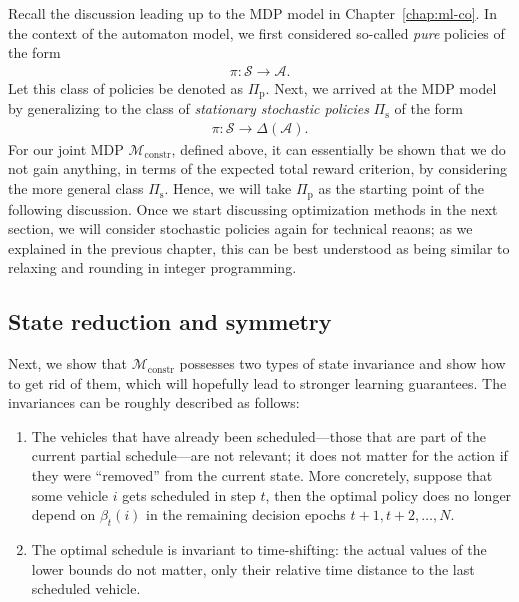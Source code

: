 \documentclass[a4paper]{report}
\theoremstyle{definition}
\theoremstyle{plain}
\begin{document}
Recall the discussion leading up to the MDP model in Chapter~\ref{chap:ml-co}.
%
In the context of the automaton model, we first considered so-called \emph{pure}
policies of the form
\begin{align}
  \label{eq:9}
  \pi : \mathcal{S} \rightarrow \mathcal{A} .
\end{align}
Let this class of policies be denoted as $\Pi_\mathrm{p}$. Next, we arrived
at the MDP model by generalizing to the class of \emph{stationary stochastic
  policies} $\Pi_\mathrm{s}$ of the form
\begin{align}
  \pi : \mathcal{S} \rightarrow \Delta(\mathcal{A}) .
\end{align}
%
For our joint MDP $\mathcal{M}_\mathrm{constr}$, defined above, it can essentially be shown that
we do not gain anything, in terms of the expected total reward criterion, by
considering the more general class $\Pi_\mathrm{s}$.
%
Hence, we will take $\Pi_\mathrm{p}$ as the starting point of the following
discussion.
%
Once we start discussing optimization methods in the next section, we will
consider stochastic policies again for technical reaons; as we explained in the
previous chapter, this can be best understood as being similar to relaxing and
rounding in integer programming.


\subsection{State reduction and symmetry}

Next, we show that $\mathcal{M}_\mathrm{constr}$ possesses two types of state
invariance and show how to get rid of them, which will hopefully lead to
stronger learning guarantees. The invariances can be roughly described as
follows:
\begin{enumerate}[label=(\roman*)\;\;,leftmargin=3.5em,midpenalty=5]
  \item The vehicles that have already been scheduled---those that are part of
        the current partial schedule---are not relevant; it does not matter for
        the action if they were ``removed'' from the current state.
        More concretely, suppose that some vehicle $i$ gets scheduled in step
        $t$, then the optimal policy does no longer depend on $\beta_t(i)$ in
        the remaining decision epochs $t+1, t+2, \dots, N$.

  \item The optimal schedule is invariant to time-shifting: the actual values of
        the lower bounds do not matter, only their relative time distance to the
        last scheduled vehicle.
\end{enumerate}
\end{document}
